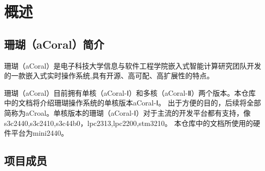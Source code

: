 \chapter{概述}

\section{珊瑚（aCoral）简介}

珊瑚（aCoral）是电子科技大学信息与软件工程学院嵌入式智能计算研究团队开发的一款嵌入式实时操作系统,具有开源、高可配、高扩展性的特点。

珊瑚（aCoral）目前拥有单核（aCoral-Ⅰ）和多核（aCoral-Ⅱ）两个版本。本仓库中的文档将介绍珊瑚操作系统的单核版本aCoral-Ⅰ。
出于方便的目的，后续将全部简称为aCroal。单核版本的珊瑚（aCoral-Ⅰ）对于主流的开发平台都有支持，像 s3c2440,s3c2410,s3c44b0，lpc2313,lpc2200,stm3210。
本仓库中的文档所使用的硬件平台为mini2440。


\section{项目成员}
